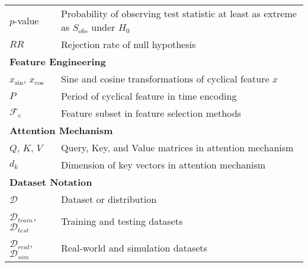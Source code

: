 \begin{appendices}
\begin{table}[htbp]
{\begin{tabular}{p{}p{}}
        $p$-value                                   & Probability of observing test statistic at least as extreme as $S_{obs}$ under $H_0$ \\
        $RR$                                        & Rejection rate of null hypothesis                                                    \\
        \midrule
        \multicolumn{2}{l}{\textbf{Feature Engineering}}                                                                                   \\
        \midrule
        $x_{\sin}$, $x_{\cos}$                      & Sine and cosine transformations of cyclical feature $x$                              \\
        $P$                                         & Period of cyclical feature in time encoding                                          \\
        $\mathcal{F}_c$                             & Feature subset in feature selection methods                                          \\
        \midrule
        \multicolumn{2}{l}{\textbf{Attention Mechanism}}                                                                                   \\
        \midrule
        $Q$, $K$, $V$                               & Query, Key, and Value matrices in attention mechanism                                \\
        $d_k$                                       & Dimension of key vectors in attention mechanism                                      \\
        \midrule
        \multicolumn{2}{l}{\textbf{Dataset Notation}}                                                                                      \\
        \midrule
        $\mathcal{D}$                               & Dataset or distribution                                                              \\
        $\mathcal{D}_{train}$, $\mathcal{D}_{test}$ & Training and testing datasets                                                        \\
        $\mathcal{D}_{real}$, $\mathcal{D}_{sim}$   & Real-world and simulation datasets                                                   \\
        \bottomrule
      \end{tabular}%
    }
  \end{table}


\end{appendices}
